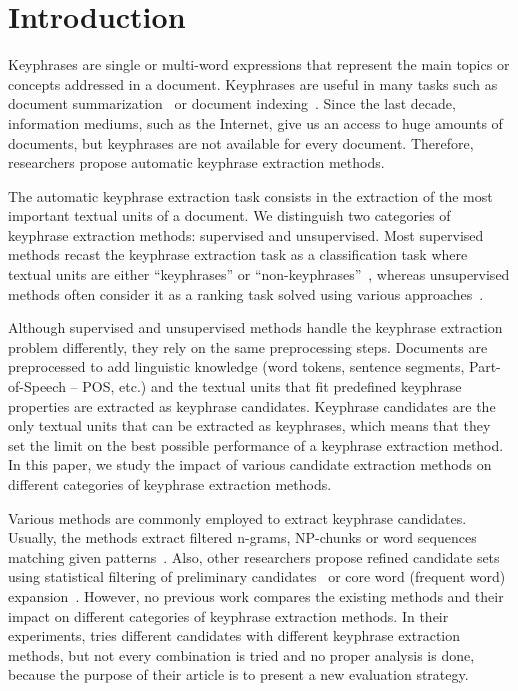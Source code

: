 \section{Introduction}
\label{sec:section}
  Keyphrases are single or multi-word expressions that represent the main topics
  or concepts addressed in a document. Keyphrases are useful in many tasks such
  as document summarization~\cite{avanzo2005keyphrase} or document
  indexing~\cite{medelyan2008smalltrainingset}. Since the last decade,
  information mediums, such as the Internet, give us an access to huge amounts
  of documents, but keyphrases are not available for every document. Therefore,
  researchers propose automatic keyphrase extraction methods.

  The automatic keyphrase extraction task consists in the extraction of the
  most important textual units of a document. We distinguish two categories of
  keyphrase extraction methods: supervised and unsupervised. Most supervised
  methods recast the keyphrase extraction task as a classification task where
  textual units are either ``keyphrases'' or
  ``non-keyphrases''~\cite{witten1999kea}, whereas unsupervised methods often
  consider it as a ranking task solved using various
  approaches~\cite{hassan2010conundrums}.

  Although supervised and unsupervised methods handle the keyphrase extraction
  problem differently, they rely on the same preprocessing steps. Documents are
  preprocessed to add linguistic knowledge (word tokens, sentence segments,
  Part-of-Speech -- POS, etc.) and the textual units that fit predefined
  keyphrase properties are extracted as keyphrase candidates. Keyphrase
  candidates are the only textual units that can be extracted as keyphrases,
  which means that they set the limit on the best possible performance of a
  keyphrase extraction method. In this paper, we study the impact of various
  candidate extraction methods on different categories of keyphrase extraction
  methods.

  Various methods are commonly employed to extract keyphrase candidates.
  Usually, the methods extract filtered n-grams, NP-chunks or word sequences
  matching given patterns~\cite{hulth2003keywordextraction}. Also, other
  researchers propose refined candidate sets using statistical filtering of
  preliminary candidates~\cite{kim2009reexaminingautomatickeyphraseextraction}
  or core word (frequent word) expansion~\cite{you2009refinedcandidateset}.
  However, no previous work compares the existing methods and their impact on
  different categories of keyphrase extraction methods. In their experiments,
   tries different candidates with different
  keyphrase extraction methods, but not every combination is tried and no proper
  analysis is done, because the purpose of their article is to present a new
  evaluation strategy.
  
